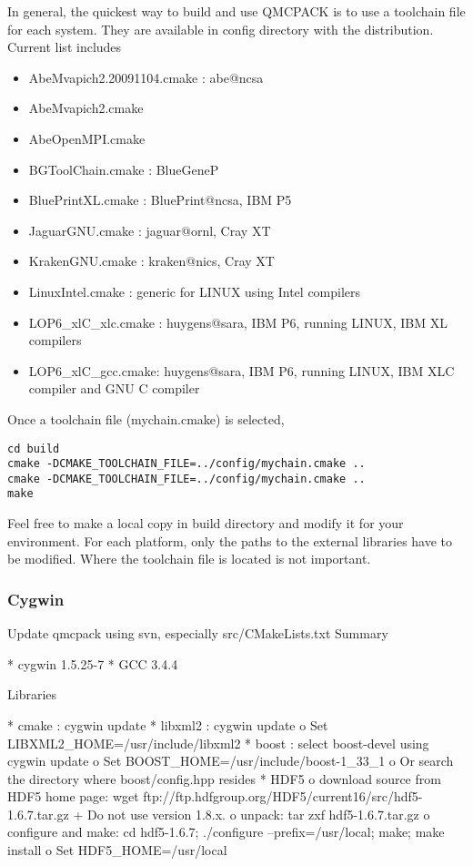 In general, the quickest way to build and use QMCPACK is to use a toolchain file for each system. They are available in config directory with the distribution. Current list includes
\begin{itemize}
\item{} AbeMvapich2.20091104.cmake : abe@ncsa
\item{} AbeMvapich2.cmake
\item{} AbeOpenMPI.cmake
\item{} BGToolChain.cmake : BlueGeneP
\item{} BluePrintXL.cmake : BluePrint@ncsa, IBM P5
\item{} JaguarGNU.cmake : jaguar@ornl, Cray XT
\item{} KrakenGNU.cmake : kraken@nics, Cray XT
\item{} LinuxIntel.cmake : generic for LINUX using Intel compilers
\item{} LOP6\_xlC\_xlc.cmake : huygens@sara, IBM P6, running LINUX, IBM XL compilers
\item{} LOP6\_xlC\_gcc.cmake: huygens@sara, IBM P6, running LINUX, IBM XLC compiler and GNU C compiler
\end{itemize}
Once a toolchain file (mychain.cmake)  is selected,
\begin{verbatim}
cd build
cmake -DCMAKE_TOOLCHAIN_FILE=../config/mychain.cmake ..
cmake -DCMAKE_TOOLCHAIN_FILE=../config/mychain.cmake ..
make
\end{verbatim}
Feel free to make a local copy in build directory and modify it for your environment. For each platform, only the paths to the external libraries have to be modified. Where the toolchain file is located is not important.

\subsubsection{Cygwin}
Update qmcpack using svn, especially src/CMakeLists.txt
 Summary

    * cygwin 1.5.25-7
    * GCC 3.4.4 

 Libraries

    * cmake : cygwin update
    * libxml2 : cygwin update
          o Set LIBXML2\_HOME=/usr/include/libxml2 
    * boost : select boost-devel using cygwin update
          o Set BOOST\_HOME=/usr/include/boost-1\_33\_1
          o Or search the directory where boost/config.hpp resides 
    * HDF5
          o download source from HDF5 home page:
            wget ftp://ftp.hdfgroup.org/HDF5/current16/src/hdf5-1.6.7.tar.gz
                + Do not use version 1.8.x. 
          o unpack:
            tar zxf hdf5-1.6.7.tar.gz
          o configure and make:
            cd hdf5-1.6.7; ./configure --prefix=/usr/local; make; make install
          o Set HDF5\_HOME=/usr/local 

